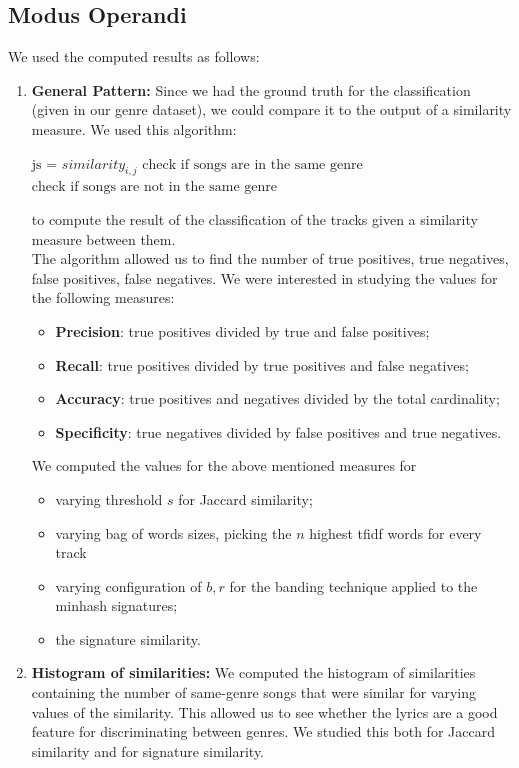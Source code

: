 \documentclass[a4paper, 11pt]{article} %
\begin{document}
\subsection*{Modus Operandi}
We used the computed results as follows:
\begin{enumerate}
	\item \textbf{General Pattern: }Since we had the ground truth for the classification (given in our genre dataset), we could compare it to the output of a similarity measure. We used this algorithm:
	
	\hrulefill
	\begin{algorithmic}
			\State $\text{js = } similarity_{i,j}$
				\State $\text{check if songs are in the same genre}$
			\Else
				\State $\text{check if songs are not in the same genre}$
			\EndIf
		\EndFor
	\end{algorithmic}
	\hrulefill
	
	to compute the result of the classification of the tracks given a similarity measure between them.\\
	
	The algorithm allowed us to find the number of true positives, true negatives, false positives, false negatives. We were interested in studying the values for the following measures:
	\begin{itemize}
		
		 \item \textbf{Precision}: true positives divided by true and false positives;
		 \item \textbf{Recall}: true positives divided by true positives and false negatives;
		 \item \textbf{Accuracy}: true positives and negatives divided by the total cardinality;
		 \item \textbf{Specificity}: true negatives divided by false positives and true negatives.
	\end{itemize}	
		 
	We computed the values for the above mentioned measures for 
	\begin{itemize}
	 	\item varying threshold $s$ for Jaccard similarity;
	 	\item varying bag of words sizes, picking the $n$ highest tfidf words for every track
	 	\item varying configuration of $b, r$ for the banding technique applied to the minhash signatures;
	 	\item the signature similarity.
	\end{itemize}
	\item \textbf{Histogram of similarities: }We computed the histogram of similarities containing the number of same-genre songs that were similar for varying values of the similarity. This allowed us to see whether the lyrics are a good feature for discriminating between genres. We studied this both for Jaccard similarity and for signature similarity.
\end{enumerate}
\end{document}
